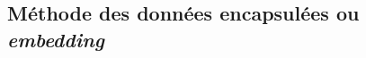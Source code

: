 \subsection{Méthode des données encapsulées ou \emph{embedding}}\label{chapter-HTT_analysis-section-bg_estimation-embedding}